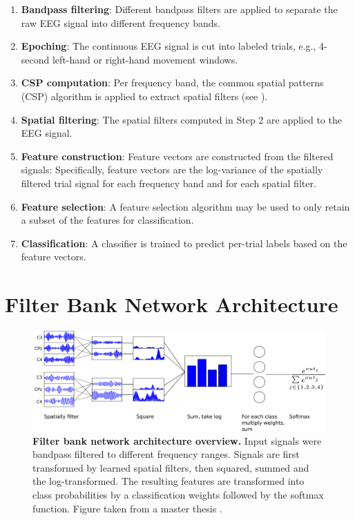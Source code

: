 \begin{enumerate}
\def\labelenumi{\arabic{enumi}.}
\item
  \textbf{Bandpass filtering}: Different bandpass filters are applied to
  separate the raw EEG signal into different frequency bands.
\item
  \textbf{Epoching}: The continuous EEG signal is cut into labeled
  trials, e.g., 4-second left-hand or right-hand movement windows.
\item
  \textbf{CSP computation}: Per frequency band, the common spatial
  patterns (CSP) algorithm is applied to extract spatial filters (see
  ).
\item
  \textbf{Spatial filtering}: The spatial filters computed in Step 2 are
  applied to the EEG signal.
\item
  \textbf{Feature construction}: Feature vectors are constructed from
  the filtered signals: Specifically, feature vectors are the
  log-variance of the spatially filtered trial signal for each frequency
  band and for each spatial filter.
\item
  \textbf{Feature selection}: A feature selection algorithm may be used
  to only retain a subset of the features for classification.
\item
  \textbf{Classification}: A classifier is trained to predict per-trial
  labels based on the feature vectors.
\end{enumerate}

\section{Filter Bank Network
Architecture}\label{filter-bank-network-architecture}


\begin{figure}[th]
    \myfloatalign
    \includegraphics[width=1\linewidth]{images/csp_as_a_net_explanation.png}
    \caption[Filter bank network architecture overview.]{
\textbf{Filter bank network architecture overview.} Input signals were
bandpass filtered to different frequency ranges. Signals are first
transformed by learned spatial filters, then squared, summed and the
log-transformed. The resulting features are transformed into class
probabilities by a classification weights followed by the softmax
function. Figure taken from a master thesis
\citep{schirrmeister_msc_thesis_2015}.}\label{filterbank-net-figure}
\end{figure}


